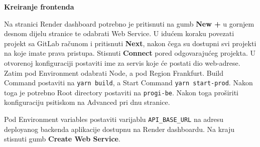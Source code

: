 		\noindent \textbf{Kreiranje frontenda}

Na stranici Render dashboard potrebno je pritisnuti na gumb \textbf{New +} u gornjem desnom dijelu stranice te odabrati Web Service. U idućem koraku povezati projekt sa GitLab računom i pritisnuti \textbf{Next}, nakon čega su dostupni svi projekti na koje imate prava pristupa. Stisnuti \textbf{Connect} pored odgovarajućeg projekta. U otvorenoj konfiguraciji postaviti ime za servis koje će postati dio web-adrese. Zatim pod Environment odabrati Node, a pod Region Frankfurt. Build Command postaviti na \texttt{yarn build}, a Start Command \texttt{yarn start-prod}. Nakon toga je potrebno Root directory postaviti na \texttt{progi-be}. Nakon toga proširiti konfiguraciju psitiskom na Advanced pri dnu stranice.\par
Pod Environment variables postaviti varijablu \texttt{API\_BASE\_URL} na adresu deployanog backenda aplikacije dostupnu na Render dashboardu. Na kraju stisnuti gumb \textbf{Create Web Service}.
			
			\eject 